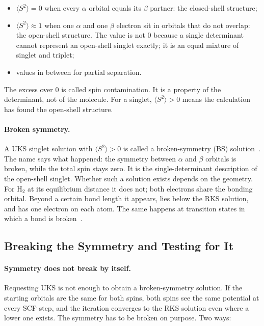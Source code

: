 \begin{itemize}
  \item $\langle S^2 \rangle = 0$ when every $\alpha$ orbital equals its
    $\beta$ partner: the closed-shell structure;
  \item $\langle S^2 \rangle \approx 1$ when one $\alpha$ and one $\beta$
    electron sit in orbitals that do not overlap: the open-shell structure.
    The value is not 0 because a single determinant cannot represent an
    open-shell singlet exactly; it is an equal mixture of singlet and
    triplet;
  \item values in between for partial separation.
\end{itemize}

The excess over 0 is called spin contamination. It is a property of the
determinant, not of the molecule. For a singlet, $\langle S^2 \rangle > 0$
means the calculation has found the open-shell structure.

\paragraph{Broken symmetry.} A UKS singlet solution with
$\langle S^2 \rangle > 0$ is called a broken-symmetry (BS)
solution~\cite{noodleman1981}. The name says what happened: the symmetry
between $\alpha$ and $\beta$ orbitals is broken, while the total spin stays
zero. It is the single-determinant description of the open-shell singlet.
Whether such a solution exists depends on the geometry. For H$_2$ at its
equilibrium distance it does not; both electrons share the bonding
orbital. Beyond a certain bond length it appears, lies below the RKS
solution, and has one electron on each atom. The same happens at
transition states in which a bond is broken~\cite{bursch2022}.

\subsection{Breaking the Symmetry and Testing for It}
\label{sec:background-stability}

\paragraph{Symmetry does not break by itself.} Requesting UKS is not
enough to obtain a broken-symmetry solution. If the starting orbitals are
the same for both spins, both spins see the same potential at every SCF
step, and the iteration converges to the RKS solution even where a lower
one exists. The symmetry has to be broken on purpose. Two ways:

